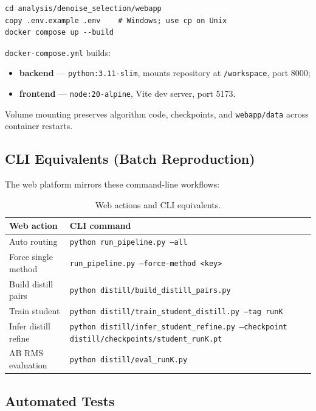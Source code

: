 \begin{verbatim}
cd analysis/denoise_selection/webapp
copy .env.example .env    # Windows; use cp on Unix
docker compose up --build
\end{verbatim}

\texttt{docker-compose.yml} builds:
\begin{itemize}
  \item \textbf{backend} --- \texttt{python:3.11-slim}, mounts repository at \texttt{/workspace}, port 8000;
  \item \textbf{frontend} --- \texttt{node:20-alpine}, Vite dev server, port 5173.
\end{itemize}
Volume mounting preserves algorithm code, checkpoints, and \texttt{webapp/data} across container restarts.

\subsection{CLI Equivalents (Batch Reproduction)}

The web platform mirrors these command-line workflows:

\begin{table}[H]
  \centering
  \caption{Web actions and CLI equivalents.}
  \label{tab:cli_equiv}
  \small
  \begin{tabular}{ll}
    \toprule
    \textbf{Web action} & \textbf{CLI command} \\
    \midrule
    Auto routing          & \texttt{python run\_pipeline.py --all} \\
    Force single method   & \texttt{run\_pipeline.py --force-method <key>} \\
    Build distill pairs   & \texttt{python distill/build\_distill\_pairs.py} \\
    Train student         & \texttt{python distill/train\_student\_distill.py --tag runK} \\
    Infer distill refine  & \texttt{python distill/infer\_student\_refine.py --checkpoint distill/checkpoints/student\_runK.pt} \\
    AB RMS evaluation     & \texttt{python distill/eval\_runK.py} \\
    \bottomrule
  \end{tabular}
\end{table}

\subsection{Automated Tests}

